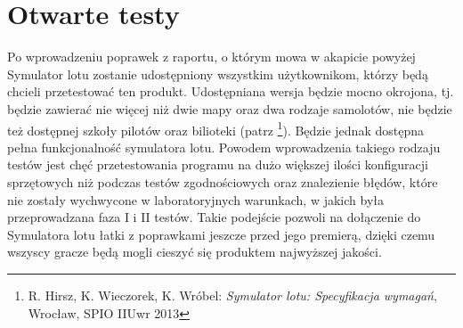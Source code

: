 \documentclass{mwrep}
\begin{document}
\section{Otwarte testy}
Po wprowadzeniu poprawek z raportu, o którym mowa w akapicie powyżej Symulator lotu zostanie udostępniony wszystkim użytkownikom, którzy będą chcieli przetestować ten produkt. Udostępniana wersja będzie mocno okrojona, tj. będzie zawierać nie więcej niż dwie mapy oraz dwa rodzaje samolotów, nie będzie też dostępnej szkoły pilotów oraz bilioteki (patrz \footnote{R. Hirsz, K. Wieczorek, K. Wróbel: \textit{Symulator lotu: Specyfikacja wymagań}, Wrocław, SPIO IIUwr 2013}). Będzie jednak dostępna pełna funkcjonalność symulatora lotu. Powodem wprowadzenia takiego rodzaju testów jest chęć przetestowania programu na dużo większej ilości konfiguracji sprzętowych niż podczas testów zgodnościowych oraz znalezienie błędów, które nie zostały wychwycone w laboratoryjnych warunkach, w jakich była przeprowadzana faza I i II testów. Takie podejście pozwoli na dołączenie do Symulatora lotu łatki z poprawkami jeszcze przed jego premierą, dzięki czemu wszyscy gracze będą mogli cieszyć się produktem najwyższej jakości.
\end{document}
